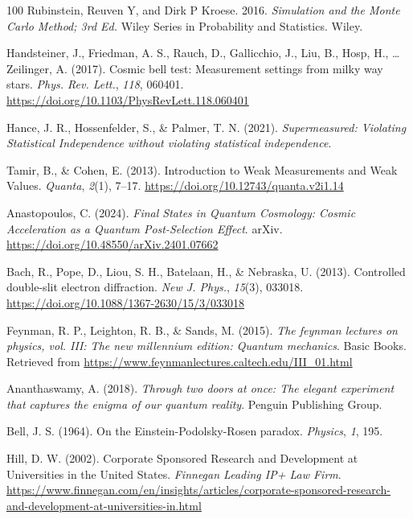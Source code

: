 \documentclass[11pt]{book}
\begin{document}
\begin{thebibliography}{100}
 Rubinstein, Reuven Y, and Dirk P Kroese. 2016. \emph{Simulation and the
Monte Carlo Method; 3rd Ed.} Wiley Series in Probability and Statistics.
Wiley.

 Handsteiner, J., Friedman, A. S., Rauch, D., Gallicchio, J., Liu, B.,
Hosp, H., \ldots{} Zeilinger, A. (2017). Cosmic bell test: Measurement
settings from milky way stars. \emph{Phys. Rev. Lett.}, \emph{118},
060401. \url{https://doi.org/10.1103/PhysRevLett.118.060401}

 Hance, J. R., Hossenfelder, S., \& Palmer, T. N. (2021).
\emph{Supermeasured: Violating Statistical Independence without
violating statistical independence}.

 Tamir, B., \& Cohen, E. (2013). Introduction to Weak Measurements and
Weak Values. \emph{Quanta}, \emph{2}(1), 7--17.
\url{https://doi.org/10.12743/quanta.v2i1.14}

 Anastopoulos, C. (2024). \emph{Final States in Quantum Cosmology: Cosmic
Acceleration as a Quantum Post-Selection Effect}. arXiv.
\url{https://doi.org/10.48550/arXiv.2401.07662}

 Bach, R., Pope, D., Liou, S. H., Batelaan, H., \& Nebraska, U. (2013).
Controlled double-slit electron diffraction. \emph{New J. Phys.},
\emph{15}(3), 033018.
\url{https://doi.org/10.1088/1367-2630/15/3/033018}

 Feynman, R. P., Leighton, R. B., \& Sands, M. (2015). \emph{The feynman
lectures on physics, vol. III: The new millennium edition: Quantum
mechanics}. Basic Books. Retrieved from
\url{https://www.feynmanlectures.caltech.edu/III_01.html}

 Ananthaswamy, A. (2018). \emph{Through two doors at once: The elegant
experiment that captures the enigma of our quantum reality}. Penguin
Publishing Group.

 Bell, J. S. (1964). On the Einstein-Podolsky-Rosen paradox.
\emph{Physics}, \emph{1}, 195.

 Hill, D. W. (2002). Corporate Sponsored Research and Development at
Universities in the United States. \emph{Finnegan \textbar{} Leading IP+
Law Firm}.
\url{https://www.finnegan.com/en/insights/articles/corporate-sponsored-research-and-development-at-universities-in.html}


\end{thebibliography}
\end{document}
